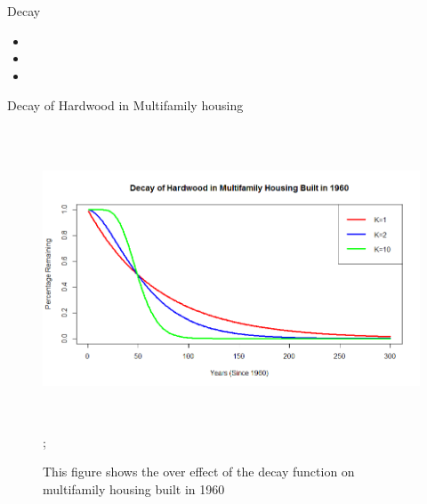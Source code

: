 \documentclass[final]{beamer}\usepackage[]{graphicx}\usepackage[]{color}
\newlength{\onecolwid}
\begin{document}
\begin{frame}[t]
\begin{columns}[t]
\begin{column}{\onecolwid}
\begin{block}{Decay}
\begin{itemize}
\item
\item
\item
\end{itemize}
\end{block}
\begin{block}{Decay of Hardwood in Multifamily housing}
\begin{center}
\begin{figure}
    {\includegraphics[width=1\linewidth, height=9cm]{Decay_Plot_Example.png}};
    \caption{This figure shows the over effect of the decay function on multifamily housing built in 1960}
\end{figure}
\end{center}

\end{block}



\end{column}
\end{columns}
\end{frame}
\end{document}
